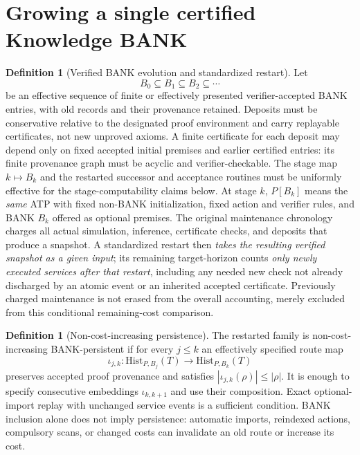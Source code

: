 \documentclass[11pt]{article}
\theoremstyle{definition}
\newtheorem{definition}[theorem]{Definition}
\newcommand{\Hist}{\mathrm{Hist}}
\begin{document}
\section{Growing a single certified Knowledge BANK}
\begin{definition}[Verified BANK evolution and standardized restart]\label{def:bank}
Let
\[
B_0\subseteq B_1\subseteq B_2\subseteq\cdots
\]
be an effective sequence of finite or effectively presented verifier-accepted BANK entries, with old records and their provenance retained. Deposits must be conservative relative to the designated proof environment and carry replayable certificates, not new unproved axioms. A finite certificate for each deposit may depend only on fixed accepted initial premises and earlier certified entries: its finite provenance graph must be acyclic and verifier-checkable. The stage map $k\mapsto B_k$ and the restarted successor and acceptance routines must be uniformly effective for the stage-computability claims below. At stage $k$, $P[B_k]$ means the \emph{same} ATP with fixed non-BANK initialization, fixed action and verifier rules, and BANK $B_k$ offered as optional premises. The original maintenance chronology charges all actual simulation, inference, certificate checks, and deposits that produce a snapshot. A standardized restart then \emph{takes the resulting verified snapshot as a given input}; its remaining target-horizon counts \emph{only newly executed services after that restart}, including any needed new check not already discharged by an atomic event or an inherited accepted certificate. Previously charged maintenance is not erased from the overall accounting, merely excluded from this conditional remaining-cost comparison.
\end{definition}

\begin{definition}[Non-cost-increasing persistence]\label{def:persist}
The restarted family is non-cost-increasing BANK-persistent if for every $j\le k$ an effectively specified route map
\[
\iota_{j,k}:\Hist_{P,B_j}(T)\longrightarrow\Hist_{P,B_k}(T)
\]
preserves accepted proof provenance and satisfies $|\iota_{j,k}(\rho)|\le |\rho|$. It is enough to specify consecutive embeddings $\iota_{k,k+1}$ and use their composition. Exact optional-import replay with unchanged service events is a sufficient condition. BANK inclusion alone does not imply persistence: automatic imports, reindexed actions, compulsory scans, or changed costs can invalidate an old route or increase its cost.
\end{definition}
\end{document}
